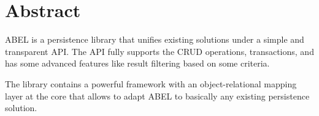 \section*{Abstract}

ABEL is a persistence library that unifies existing solutions under a simple and transparent API.
The API fully supports the CRUD operations, transactions, and has some advanced features like result filtering based on some criteria.

The library contains a powerful framework with an object-relational mapping layer at the core that allows to adapt ABEL to basically any existing persistence solution.